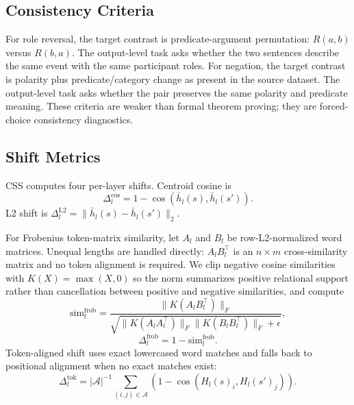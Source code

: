 \documentclass{article}
\begin{document}
\subsection{Consistency Criteria}

For role reversal, the target contrast is predicate-argument permutation: $R(a,b)$ versus $R(b,a)$. The output-level task asks whether the two sentences describe the same event with the same participant roles. For negation, the target contrast is polarity plus predicate/category change as present in the source dataset. The output-level task asks whether the pair preserves the same polarity and predicate meaning. These criteria are weaker than formal theorem proving; they are forced-choice consistency diagnostics.

\subsection{Shift Metrics}

CSS computes four per-layer shifts. Centroid cosine is
\begin{equation}
    \Delta^{\mathrm{cos}}_l =
    1-\cos(\bar{h}_l(s),\bar{h}_l(s')).
\end{equation}
L2 shift is $\Delta^{\mathrm{L2}}_l=\|\bar{h}_l(s)-\bar{h}_l(s')\|_2$.

For Frobenius token-matrix similarity, let $A_l$ and $B_l$ be row-L2-normalized word matrices. Unequal lengths are handled directly: $A_lB_l^\top$ is an $n \times m$ cross-similarity matrix and no token alignment is required. We clip negative cosine similarities with $K(X)=\max(X,0)$ so the norm summarizes positive relational support rather than cancellation between positive and negative similarities, and compute
\begin{equation}
    \mathrm{sim}^{\mathrm{frob}}_l =
    \frac{\|K(A_lB_l^\top)\|_F}
    {\sqrt{\|K(A_lA_l^\top)\|_F\|K(B_lB_l^\top)\|_F + \epsilon}},
\end{equation}
\begin{equation}
    \Delta^{\mathrm{frob}}_l = 1-\mathrm{sim}^{\mathrm{frob}}_l .
\end{equation}
Token-aligned shift uses exact lowercased word matches and falls back to positional alignment when no exact matches exist:
\begin{equation}
    \Delta^{\mathrm{tok}}_l =
    |\mathcal{A}|^{-1}
    \sum_{(i,j)\in\mathcal{A}}
    \left(1-\cos(H_l(s)_i,H_l(s')_j)\right).
\end{equation}
\end{document}
